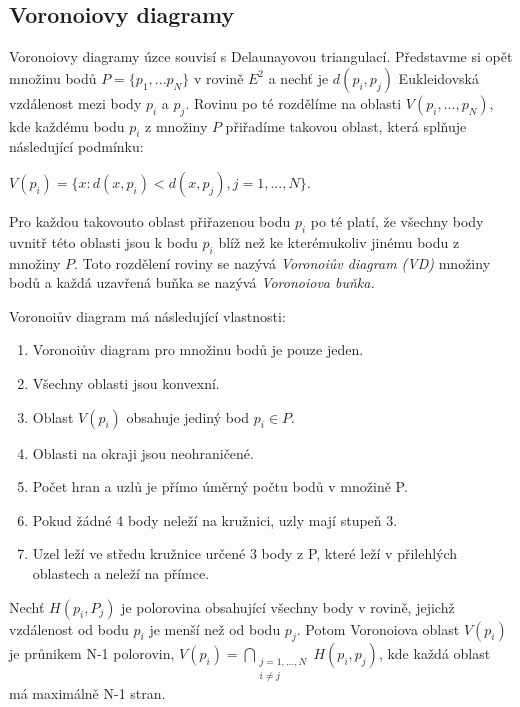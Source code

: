 \documentclass[12pt,a4paper]{article}
\begin{document}
\newpage
\subsection{Voronoiovy diagramy}

Voronoiovy diagramy úzce souvisí s Delaunayovou triangulací. Představme si opět množinu bodů $P = \{p_1,...p_N\} $ v rovině $E^2$ a nechť je $d(p_i,p_j) $ Eukleidovská vzdálenost mezi body $p_i$ a $p_j$. Rovinu po té rozdělíme na oblasti $V(p_i,...,p_N)$, kde každému bodu $p_i$ z množiny $P$ přiřadíme takovou oblast, která splňuje následující podmínku: 

$V(p_i) = \{ x: d(x, p_i) < d(x, p_j), j = 1,...,N\}$.

Pro každou takovouto oblast přiřazenou bodu $p_i$ po té platí, že všechny body uvnitř této oblasti jsou k bodu $p_i$ blíž než ke kterémukoliv jinému bodu z množiny $P$. Toto rozdělení roviny se nazývá \emph{Voronoiův diagram (VD)} množiny bodů a každá uzavřená buňka se nazývá \emph{Voronoiova buňka.}

\bigskip
Voronoiův diagram má následující vlastnosti: 
\begin{enumerate}
\item Voronoiův diagram pro množinu bodů je pouze jeden.
\item Všechny oblasti jsou konvexní.
\item Oblast $V(p_i)$ obsahuje jediný bod $p_i \in P$.
\item Oblasti na okraji jsou neohraničené.
\item Počet hran a uzlů je přímo úměrný počtu bodů v množině P.
\item Pokud žádné 4 body neleží na kružnici, uzly mají stupeň 3.
\item Uzel leží ve středu kružnice určené 3 body z P, které leží v přilehlých oblastech a neleží na přímce.
\end{enumerate}

Nechť $H(p_i,P_j)$ je polorovina obsahující všechny body v rovině, jejichž vzdálenost od bodu $p_i$ je menší než od bodu $p_j$. Potom Voronoiova oblast $V(p_i)$ je průnikem N-1 polorovin,
$V(p_i)= \bigcap\limits_{\substack{j=1,...,N \\ i\not=j}}H(p_i,p_j)$, kde každá oblast má maximálně N-1 stran.
\end{document}
